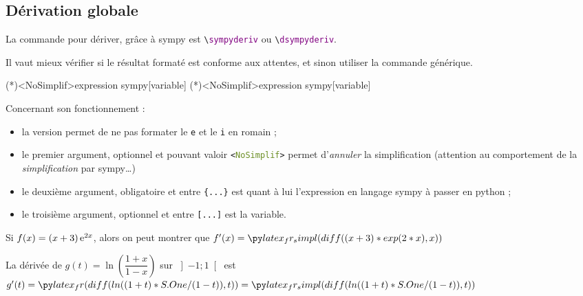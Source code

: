 \documentclass[french,a4paper,11pt]{article}
\newcommand\Cle[1]{{\bfseries\sffamily\textlangle #1\textrangle}}
\begin{document}
\subsection{Dérivation globale}

\begin{cautionblock}
La commande pour dériver, grâce à \textsf{sympy} est \texttt{\textbackslash \textcolor{purple}{sympyderiv}} ou \texttt{\textbackslash \textcolor{purple}{dsympyderiv}}.

Il vaut mieux vérifier si le résultat formaté est conforme aux attentes, et sinon utiliser la commande générique.
\end{cautionblock}

\begin{bloctext}
\sympyderiv(*)<NoSimplif>{expression sympy}[variable]
\dsympyderiv(*)<NoSimplif>{expression sympy}[variable]
\end{bloctext}

\begin{tipblock}
Concernant son fonctionnement :

\begin{itemize}
	\item la version \Cle{*} permet de ne pas formater le \texttt{e} et le \texttt{i} en \textsf{romain} ;
	\item le premier argument, optionnel et pouvant valoir \texttt{<\textcolor{OliveDrab}{NoSimplif}>} permet d'\textit{annuler} la simplification (attention au comportement de la \textit{simplification} par \textsf{sympy}\ldots)
	\item le deuxième argument, obligatoire et entre \texttt{\{...\}} est quant à lui l'expression en langage \textsf{sympy} à passer en \textsf{python} ;
	\item le troisième argument, optionnel et entre \texttt{[...]} est la variable.
\end{itemize}
\vspace*{-\baselineskip}\leavevmode
\end{tipblock}

\begin{bloctext}
Si $f(x)=(x+3)\,\mathrm{e}^{2x}$, alors on peut montrer que $f'(x) = \sympyderiv{(x+3)*exp(2*x)}$
\end{bloctext}

\begin{bloctext}
La dérivée de $g(t)=\ln\left(\dfrac{1+x}{1-x}\right)$ sur
$\left]-1;1\right[$ est $g'(t) = \dsympyderiv<NoSimplif>{ln((1+t)/(1-t))}[t]
= \dsympyderiv{ln((1+t)/(1-t))}[t]$
\end{bloctext}
\end{document}
